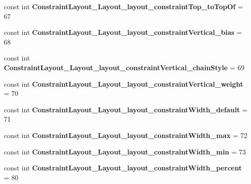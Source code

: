 \begin{DoxyCompactItemize}
const int {\bfseries Constraint\+Layout\+\_\+\+Layout\+\_\+layout\+\_\+constraint\+Top\+\_\+to\+Top\+Of} = 67
\item 
\mbox{\label{classst_delivery_1_1_resource_1_1_styleable_a063e1946b84080b18eeced37986cfeec}} 
const int {\bfseries Constraint\+Layout\+\_\+\+Layout\+\_\+layout\+\_\+constraint\+Vertical\+\_\+bias} = 68
\item 
\mbox{\label{classst_delivery_1_1_resource_1_1_styleable_a232d3248ad7fd3ea11932f752cfa8dff}} 
const int {\bfseries Constraint\+Layout\+\_\+\+Layout\+\_\+layout\+\_\+constraint\+Vertical\+\_\+chain\+Style} = 69
\item 
\mbox{\label{classst_delivery_1_1_resource_1_1_styleable_aef2ba4446807512b55bb50eda75a99ac}} 
const int {\bfseries Constraint\+Layout\+\_\+\+Layout\+\_\+layout\+\_\+constraint\+Vertical\+\_\+weight} = 70
\item 
\mbox{\label{classst_delivery_1_1_resource_1_1_styleable_afcaced2d3ec3e33677a85adba9ec4ed8}} 
const int {\bfseries Constraint\+Layout\+\_\+\+Layout\+\_\+layout\+\_\+constraint\+Width\+\_\+default} = 71
\item 
\mbox{\label{classst_delivery_1_1_resource_1_1_styleable_aff8cad0e347c3ed762741a5961bf0dd9}} 
const int {\bfseries Constraint\+Layout\+\_\+\+Layout\+\_\+layout\+\_\+constraint\+Width\+\_\+max} = 72
\item 
\mbox{\label{classst_delivery_1_1_resource_1_1_styleable_a367d25671722c58b16336c6cfd35deed}} 
const int {\bfseries Constraint\+Layout\+\_\+\+Layout\+\_\+layout\+\_\+constraint\+Width\+\_\+min} = 73
\item 
\mbox{\label{classst_delivery_1_1_resource_1_1_styleable_a417e32f804bb534774d7b5e4b4f50916}} 
const int {\bfseries Constraint\+Layout\+\_\+\+Layout\+\_\+layout\+\_\+constraint\+Width\+\_\+percent} = 80
\item 
\mbox{\label{classst_delivery_1_1_resource_1_1_styleable_a08df6777b7eeb76bad034dae9b16dcda}} 

\end{DoxyCompactItemize}
